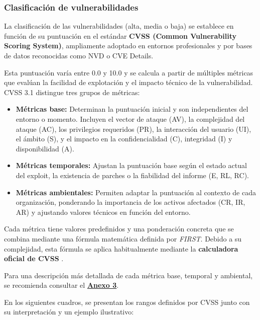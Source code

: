 \documentclass[a4paper, 11pt]{article}
\begin{document}
\subsubsection{Clasificación de vulnerabilidades}

La clasificación de las vulnerabilidades (alta, media o baja) se establece en función de su puntuación en el estándar \textbf{CVSS (Common Vulnerability Scoring System)}, ampliamente adoptado en entornos profesionales y por bases de datos reconocidas como NVD o CVE Details. \cite{cvss}

Esta puntuación varía entre 0.0 y 10.0 y se calcula a partir de múltiples métricas que evalúan la facilidad de explotación y el impacto técnico de la vulnerabilidad. CVSS 3.1 distingue tres grupos de métricas:

\begin{itemize}
\item \textbf{Métricas base:} Determinan la puntuación inicial y son independientes del entorno o momento. Incluyen el vector de ataque (AV), la complejidad del ataque (AC), los privilegios requeridos (PR), la interacción del usuario (UI), el ámbito (S), y el impacto en la confidencialidad (C), integridad (I) y disponibilidad (A).

\item \textbf{Métricas temporales:} Ajustan la puntuación base según el estado actual del exploit, la existencia de parches o la fiabilidad del informe (E, RL, RC).

\item \textbf{Métricas ambientales:} Permiten adaptar la puntuación al contexto de cada organización, ponderando la importancia de los activos afectados (CR, IR, AR) y ajustando valores técnicos en función del entorno.
\end{itemize}

Cada métrica tiene valores predefinidos y una ponderación concreta que se combina mediante una fórmula matemática definida por \textit{FIRST}. Debido a su complejidad, esta fórmula se aplica habitualmente mediante la \textbf{calculadora oficial de CVSS} \cite{cvsscalc}.

Para una descripción más detallada de cada métrica base, temporal y ambiental, se recomienda consultar el \hyperref[anexo:3]{\textbf{Anexo 3}}.

\vspace{0.5cm}

En los siguientes cuadros, se presentan los rangos definidos por CVSS junto con su interpretación y un ejemplo ilustrativo:
\end{document}
